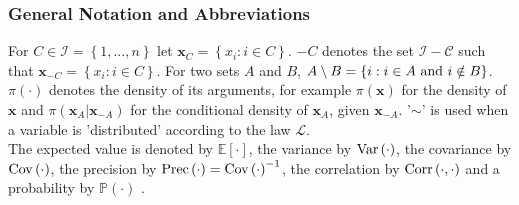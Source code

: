 \subsubsection*{General Notation and Abbreviations}
For $C\in\mathcal{I}=\left\lbrace1,...,n\right\rbrace$ let $\pmb{x}_C=\left\lbrace x_i:i\in C\right\rbrace$. $-C$ denotes the set $\mathcal{I-C}$ such that $\pmb{x}_{-C}=\left\lbrace x_i:i\in C\right\rbrace$. For two sets $A$ and $B$, $A\setminus B=\left\lbrace i:i\in A \hbox{ and } i \notin B\right\rbrace$. \\
$\pi\left(\cdot\right)$ denotes the density of its arguments, for example $\pi\left(\pmb{x}\right)$ for the density of $\pmb{x}$ and $\pi\left(\pmb{x}_A|\pmb{x}_{-A}\right)$ for the conditional density of $\pmb{x}_A$, given $\pmb{x}_{-A}$. '$\sim$' is used when a variable is 'distributed' according to the law $\mathcal{L}$.  \\
The expected value is denoted by $\mathbb{E}\left[\cdot\right]$, the variance by $\hbox{Var}\left(\cdot\right)$, the covariance by $\hbox{Cov}\left(\cdot\right)$, the precision by $\hbox{Prec}\left(\cdot\right)=\hbox{Cov}\left(\cdot\right)^{-1}$, the correlation by $\hbox{Corr}\left(\cdot,\cdot\right)$ and a probability by $\mathbb{P}\left(\cdot\right)$  \autocite[][16]{rue2005gaussian}.
